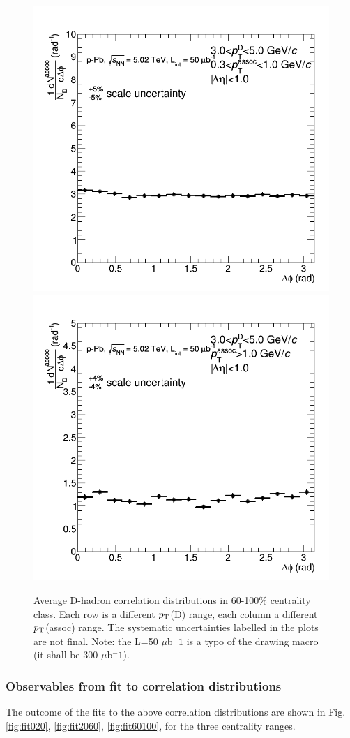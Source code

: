 \begin{figure}
{\includegraphics[width=0.32\linewidth]{figuresVsCent/Averages/60100/CanvaAndVariedHistoWeightedAverageDzeroDstarDplus_pPb_Pt3to5assocPt03to1.png}}
{\includegraphics[width=0.32\linewidth]{figuresVsCent/Averages/60100/CanvaAndVariedHistoWeightedAverageDzeroDstarDplus_pPb_Pt3to5assocPt1to99.png}}
 \caption{Average D-hadron correlation distributions in 60-100\% centrality class. Each row is a different $p_{\rm T}$(D) range, each column a different $p_{\rm T}$(assoc) range. The systematic uncertainties labelled in the plots are not final. Note: the L=50 $\mu$b$^-1$ is a typo of the drawing macro (it shall be 300 $\mu$b$^-1$).}
\label{fig:avgcorr60100}
\end{figure}
\clearpage

\subsubsection{Observables from fit to correlation distributions}
The outcome of the fits to the above correlation distributions are shown in Fig. \ref{fig:fit020}, \ref{fig:fit2060}, \ref{fig:fit60100}, for the three centrality ranges.

